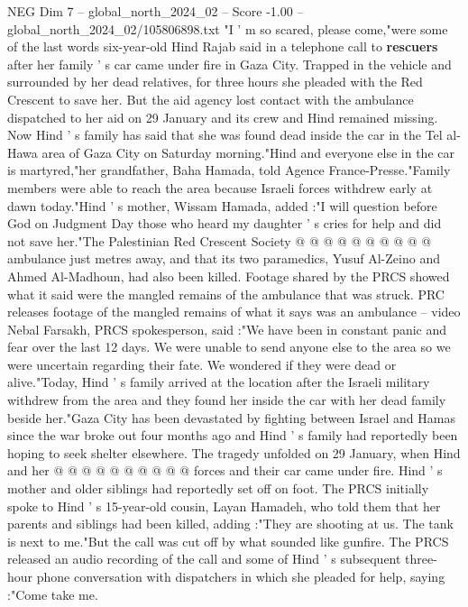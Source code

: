 \begin{textsample}{NEG Dim 7 – global\_north\_2024\_02 – Score -1.00 – global\_north\_2024\_02/105806898.txt}  \label{ex:f7_neg_429}
"I ' m so scared, please come,"were some of the last words six-year-old Hind Rajab said in a telephone call to \textbf{rescuers} after her family ' s car came under fire in Gaza City.
Trapped in the vehicle and surrounded by her dead relatives, for three hours she pleaded with the Red Crescent to save her.
But the aid agency lost contact with the ambulance dispatched to her aid on 29 January and its crew and Hind remained missing.
Now Hind ' s family has said that she was found dead inside the car in the Tel al-Hawa area of Gaza City on Saturday morning."Hind and everyone else in the car is martyred,"her grandfather, Baha Hamada, told Agence France-Presse."Family members were able to reach the area because Israeli forces withdrew early at dawn today."Hind ' s mother, Wissam Hamada, added :"I will question before God on Judgment Day those who heard my daughter ' s cries for help and did not save her."The Palestinian Red Crescent Society @ @ @ @ @ @ @ @ @ @ ambulance just metres away, and that its two paramedics, Yusuf Al-Zeino and Ahmed Al-Madhoun, had also been killed.
Footage shared by the PRCS showed what it said were the mangled remains of the ambulance that was struck.
PRC releases footage of the mangled remains of what it says was an ambulance -- video Nebal Farsakh, PRCS spokesperson, said :"We have been in constant panic and fear over the last 12 days.
We were unable to send anyone else to the area so we were uncertain regarding their fate.
We wondered if they were dead or alive."Today, Hind ' s family arrived at the location after the Israeli military withdrew from the area and they found her inside the car with her dead family beside her."Gaza City has been devastated by fighting between Israel and Hamas since the war broke out four months ago and Hind ' s family had reportedly been hoping to seek shelter elsewhere.
The tragedy unfolded on 29 January, when Hind and her @ @ @ @ @ @ @ @ @ @ forces and their car came under fire.
Hind ' s mother and older siblings had reportedly set off on foot.
The PRCS initially spoke to Hind ' s 15-year-old cousin, Layan Hamadeh, who told them that her parents and siblings had been killed, adding :"They are shooting at us.
The tank is next to me."But the call was cut off by what sounded like gunfire.
The PRCS released an audio recording of the call and some of Hind ' s subsequent three-hour phone conversation with dispatchers in which she pleaded for help, saying :"Come take me.

\end{textsample}
